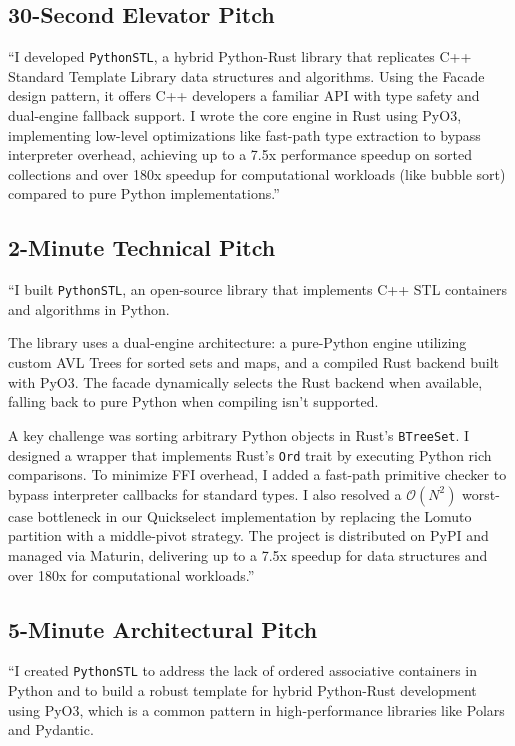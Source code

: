 \documentclass[11pt,a4paper]{article}
\begin{document}
\subsection{30-Second Elevator Pitch}
``I developed \texttt{PythonSTL}, a hybrid Python-Rust library that replicates C++ Standard Template Library data structures and algorithms. Using the Facade design pattern, it offers C++ developers a familiar API with type safety and dual-engine fallback support. I wrote the core engine in Rust using PyO3, implementing low-level optimizations like fast-path type extraction to bypass interpreter overhead, achieving up to a 7.5x performance speedup on sorted collections and over 180x speedup for computational workloads (like bubble sort) compared to pure Python implementations.''

\subsection{2-Minute Technical Pitch}
``I built \texttt{PythonSTL}, an open-source library that implements C++ STL containers and algorithms in Python. 

The library uses a dual-engine architecture: a pure-Python engine utilizing custom AVL Trees for sorted sets and maps, and a compiled Rust backend built with PyO3. The facade dynamically selects the Rust backend when available, falling back to pure Python when compiling isn't supported. 

A key challenge was sorting arbitrary Python objects in Rust's \texttt{BTreeSet}. I designed a wrapper that implements Rust's \texttt{Ord} trait by executing Python rich comparisons. To minimize FFI overhead, I added a fast-path primitive checker to bypass interpreter callbacks for standard types. I also resolved a $\mathcal{O}(N^2)$ worst-case bottleneck in our Quickselect implementation by replacing the Lomuto partition with a middle-pivot strategy. The project is distributed on PyPI and managed via Maturin, delivering up to a 7.5x speedup for data structures and over 180x for computational workloads.''

\subsection{5-Minute Architectural Pitch}
``I created \texttt{PythonSTL} to address the lack of ordered associative containers in Python and to build a robust template for hybrid Python-Rust development using PyO3, which is a common pattern in high-performance libraries like Polars and Pydantic.
\end{document}
